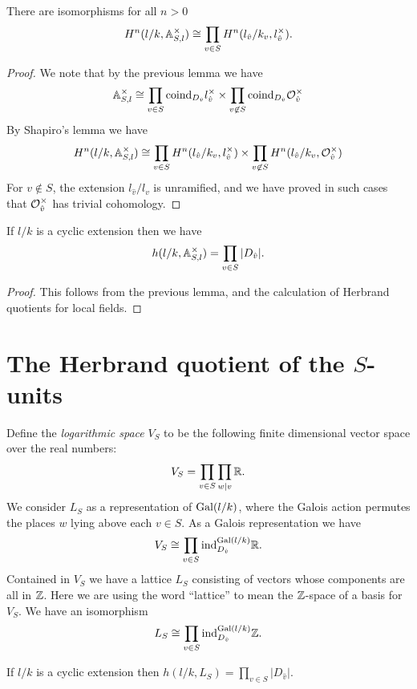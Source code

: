 \begin{lemma}
	There are isomorphisms for all $n > 0$
	\[
		H^n(l/k, {\mathbb A}_{S,l}^\times)
		\cong
		\prod_{v \in S} H^n(l_{\hat v} / k_v, l_{\hat v}^\times).
	\]
\end{lemma}

\begin{proof}
	We note that by the previous lemma we have
	\[
		{\mathbb A}_{S,l}^\times \cong \prod_{v \in S} \mathrm{coind}_{D_{\hat v}} l_{\hat v}^\times
		\times
		\prod_{v \not\in S} \mathrm{coind}_{D_{\hat v}} {\mathcal O}_{\hat v}^\times
	\]
	By Shapiro's lemma we have
	\[
		H^n(l/k,{\mathbb A}_{S,l}^\times) \cong
		\prod_{v \in S} H^n(l_{\hat v}/k_v , l_{\hat v}^\times)
		\times
		\prod_{v \not\in S} H^n(l_{\hat v}/k_v , {\mathcal O}_{\hat v}^\times)
	\]
	For $v \not\in S$, the extension $l_{\hat{v}}/l_v$ is unramified, and
	we have proved in such cases that ${\mathcal O}_{\hat v}^\times$ has trivial cohomology.
\end{proof}


\begin{lemma}
	If $l/k$ is a cyclic extension then we have
	\[
		h(l/k, {\mathbb A}_{S,l} ^\times )
		=
		\prod_{v \in S} |D_{\hat v}|.
	\]
\end{lemma}

\begin{proof}
	This follows from the previous lemma, and the
	calculation of Herbrand quotients for local fields.
\end{proof}



\section{The Herbrand quotient of the $S$-units}

Define the \emph{logarithmic space} $V_S$ to be the following finite dimensional vector space
over the real numbers:
\[
	V_S = \prod_{v \in S} \prod_{w | v} {\mathbb R}.
\]
We consider $L_S$ as a representation of $\mathrm{Gal}(l/k)$, where the Galois action
permutes the places $w$ lying above each $v \in S$.
As a Galois representation we have
\[
	V_S \cong \prod_{v \in S} \mathrm{ind}_{D_{\hat v}}^{\mathrm{Gal}(l/k)} {\mathbb R}.
\]
Contained in $V_S$ we have a lattice $L_S$ consisting of vectors whose components are all in ${\mathbb Z}$.
Here we are using the word ``lattice'' to mean the ${\mathbb Z}$-space of a basis for $V_S$.
We have an isomorphism
\[
	L_S \cong \prod_{v \in S} \mathrm{ind}_{D_{\hat v}}^{\mathrm{Gal}(l/k)} {\mathbb Z}.
\]

\begin{lemma}
	If $l/k$ is a cyclic extension then
	$h(l/k,L_S) = \prod_{v \in S} |D_{\hat v}|$.
\end{lemma}

